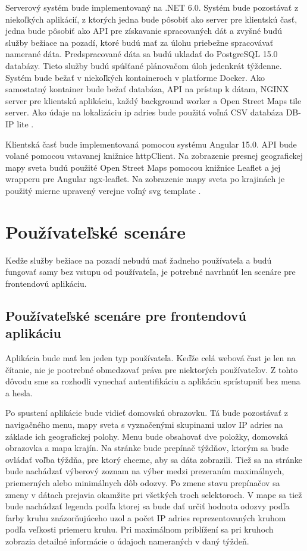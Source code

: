 Serverový systém bude implementovaný na .NET 6.0. Systém bude pozostávať z niekoľkých aplikácií, z ktorých jedna bude pôsobiť ako 
server pre klientskú časť, jedna bude pôsobiť ako API pre získavanie spracovaných dát a zvyšné budú služby bežiace na pozadí, ktoré budú mať za úlohu
priebežne spracovávať namerané dáta. Predspracované dáta sa budú ukladať do PostgreSQL 15.0 databázy. Tieto služby budú spúšťané plánovačom úloh
jedenkrát týždenne. Systém bude bežať v niekoľkých kontaineroch v platforme Docker. Ako samostatný kontainer bude bežať databáza, API na prístup k 
dátam, NGINX server pre klientskú aplikáciu, každý background worker a Open Street Maps tile server. Ako údaje na lokalizáciu ip adries bude 
použitá voľná CSV databáza DB-IP lite \cite{ip_city_db}.

Klientská časť bude implementovaná pomocou systému Angular 15.0. API bude volané pomocou vstavanej knižnice httpClient. Na zobrazenie 
presnej geografickej mapy sveta budú použité Open Street Maps pomocou knižnice Leaflet a jej wrapperu pre Angular ngx-leaflet. Na zobrazenie 
mapy sveta po krajinách je použitý mierne upravený verejne voľný svg template \cite{svg_mapa}.

\section{Používateľské scenáre}
Keďže služby bežiace na pozadí nebudú mať žadneho používateľa a budú fungovať samy bez vstupu od používateľa, je potrebné navrhnúť len scenáre 
pre frontendovú aplikáciu.

\subsection{Používateľské scenáre pre frontendovú aplikáciu}
\label{scenare}
Aplikácia bude mať len jeden typ používateľa. Keďže celá webová čast je len na čítanie, nie je pootrebné obmedzovať práva pre niektorých používateľov. 
Z tohto dôvodu sme sa rozhodli vynechať autentifikáciu a aplikáciu sprístupniť bez mena a hesla.

Po spustení aplikácie bude vidieť domovskú obrazovku. Tá bude pozostávať z navigačného menu, mapy sveta s vyznačenými skupinami 
uzlov IP adries na základe ich geografickej polohy. Menu bude obsahovať dve položky, domovská obrazovka a mapa krajín. Na stránke bude prepínač týždňov, 
ktorým sa bude ovládať voľba týždňa, pre ktorý chceme, aby sa dáta zobrazili. Tiež sa na stránke bude nachádzať výberový zoznam na výber medzi prezeraním 
maximálnych, priemerných alebo minimálnych dôb odozvy. Po zmene stavu prepínačov sa zmeny v dátach prejavia okamžite pri všetkých troch selektoroch. 
V mape sa tiež bude nachádzať legenda podľa ktorej sa bude dať určiť hodnota odozvy podľa farby kruhu znázorňujúceho uzol a počet IP adries reprezentovaných 
kruhom podľa veľkosti priemeru kruhu. Pri maximálnom priblížení sa pri kruhoch zobrazia detailné informácie o údajoch nameraných v daný týždeň.

